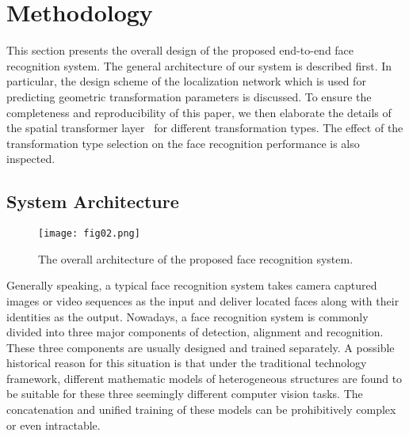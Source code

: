 \documentclass[10pt,twocolumn,letterpaper]{article}
\begin{document}

\section{Methodology}


This section presents the overall design of the proposed end-to-end face recognition system. 
The general architecture of our system is described first. In particular, the design scheme of the localization network which is used for predicting geometric transformation parameters is discussed. 
To ensure the completeness and reproducibility of this paper, we then elaborate the details of the spatial transformer layer~\cite{jaderberg2015spatial} for different transformation types. 
The effect of the transformation type selection on the face recognition performance is also inspected.

\subsection{System Architecture}
		
\begin{figure*}[htbp]
\begin{center}
\texttt{[image: fig02.png]}
\end{center}
\caption{The overall architecture  of the proposed face recognition system.}
\label{fig02}
\end{figure*}
	
Generally speaking, a typical face recognition system takes camera captured images or video sequences as the input and deliver located faces along with their identities as the output.
Nowadays, a face recognition system is commonly divided into three major components of detection, alignment and recognition.
These three components are usually designed and trained separately. 
A possible historical reason for this situation is that under the traditional technology framework, different mathematic models of heterogeneous structures are found to be suitable for these three seemingly different computer vision tasks. 
The concatenation and unified training of these models can be prohibitively complex or even intractable.
\end{document}
